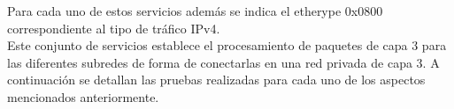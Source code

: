 Para cada uno de estos servicios adem\'as se indica el etherype 0x0800 correspondiente al tipo de tr\'afico IPv4.\\

Este conjunto de servicios establece el procesamiento de paquetes de capa 3 para las diferentes subredes de forma de conectarlas en una red privada de capa 3. A continuaci\'on se detallan las pruebas realizadas para cada uno de los aspectos mencionados anteriormente.




% 
%
%
%
%
%
%

